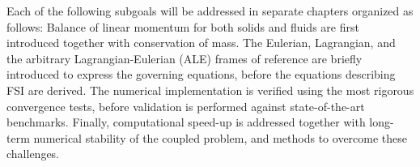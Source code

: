 Each of the following subgoals will be addressed in separate chapters organized as follows: Balance of linear momentum for both solids and fluids are first introduced together with conservation of mass. The Eulerian, Lagrangian, and the arbitrary Lagrangian-Eulerian (ALE) frames of reference are briefly introduced to express the governing equations, before the equations describing FSI are derived. The numerical implementation is verified using the most rigorous convergence tests, before validation is performed against state-of-the-art benchmarks. Finally, computational speed-up is addressed together with long-term numerical stability of the coupled problem, and methods to overcome these challenges.
 
